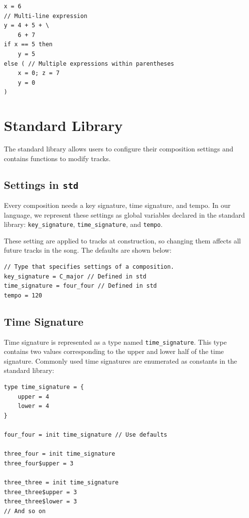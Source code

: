 \documentclass[11pt, onecolumn, letterpaper]{article}
\begin{document}
\begin{lstlisting}
x = 6
// Multi-line expression
y = 4 + 5 + \
    6 + 7
if x == 5 then
    y = 5
else ( // Multiple expressions within parentheses
    x = 0; z = 7
    y = 0
)
\end{lstlisting}

\section{Standard Library}
The standard library allows users to configure their composition settings and contains functions to modify tracks.

\subsection{Settings in \texttt{std}}
Every composition needs a key signature, time signature, and tempo. In our language, we represent these settings as global variables declared in the standard library: \texttt{key\_signature}, \texttt{time\_signature}, and \texttt{tempo}. 

These setting are applied to tracks at construction, so changing them affects all future tracks in the song. The defaults are shown below:

\begin{lstlisting}
// Type that specifies settings of a composition.
key_signature = C_major // Defined in std
time_signature = four_four // Defined in std
tempo = 120
\end{lstlisting}

\subsection{Time Signature}
Time signature is represented as a type named \texttt{time\_signature}. This type contains two values corresponding to the upper and lower half of the time signature. Commonly used time signatures are enumerated as constants in the standard library:

\begin{lstlisting}
type time_signature = {
    upper = 4
    lower = 4
}

four_four = init time_signature // Use defaults

three_four = init time_signature
three_four$upper = 3

three_three = init time_signature
three_three$upper = 3
three_three$lower = 3
// And so on
\end{lstlisting}
\end{document}
